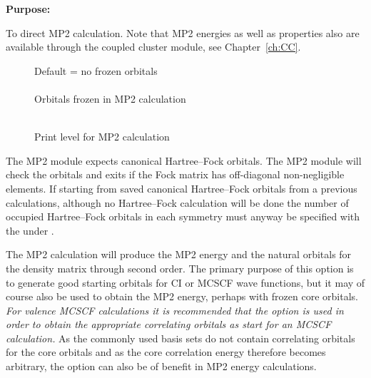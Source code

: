 {\bf Purpose:}

To direct MP2 calculation. Note that MP2 energies as well as
properties also are available through the coupled cluster module, see
Chapter~\ref{ch:CC}.

\begin{description}
\item[]
  Default = no frozen orbitals\\
   \\
  Orbitals frozen in MP2 calculation

\item[]
   \\
  Print level for MP2 calculation
\end{description}




The MP2 module expects canonical Hartree--Fock orbitals. The MP2 module will
check the orbitals and exits if the Fock matrix has off-diagonal non-negligible
elements.
If starting from saved canonical Hartree--Fock orbitals from a previous calculations,
although no Hartree--Fock calculation will be done
the number of occupied Hartree--Fock orbitals in each symmetry must anyway be
specified with the  under .

The MP2 calculation will produce the MP2 energy and the natural orbitals
for the density matrix through second order.  The primary purpose of
this option is to generate good starting orbitals for CI or MCSCF wave
functions, but it
may of course also be used to obtain the MP2 energy, perhaps with frozen
core orbitals. {\em For valence MCSCF calculations it is recommended that the
 option is used in order to obtain the appropriate
correlating orbitals as start
for an MCSCF calculation.\/}  As the commonly
used basis sets do not contain correlating orbitals for the core
orbitals and as the core correlation energy therefore becomes arbitrary,
the  option can also be of benefit in MP2 energy
calculations.

\pagebreak[3]
\subsection{\label{ref-nevpt2inp}}

